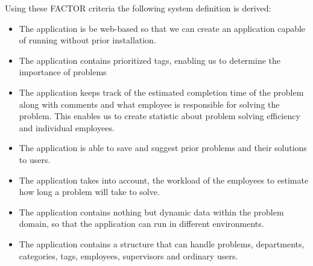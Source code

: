 Using these FACTOR criteria the following system definition is derived:
\begin{itemize}
\item The application is be web-based so that we can create an application capable of running without prior installation.
\item The application contains prioritized tags, enabling us to determine the importance of problems
\item The application keeps track of the estimated completion time of the problem along with comments and what employee is responsible for solving the problem. This enables us to create statistic about problem solving efficiency and individual employees.
\item The application is able to save and suggest prior problems and their solutions to users.
\item The application takes into account, the workload of the employees to estimate how long a problem will take to solve.
\item The application contains nothing but dynamic data within the problem domain, so that the application can run in different environments.
\item The application contains a structure that can handle problems, departments, categories, tags, employees, supervisors and ordinary users.
\end{itemize}


\begin{comment}
Using these FACTOR criteria, we arrive at the following system definition:
\begin{itemize}
\item The application is be web-based so that we can create an application capable of running without prior installation.
\item The application should contain prioritized tags, enabling us to determine the importance of problems
\item The application should keep track of the estimated completion time of the problem along with comments and what employee is responsible for the problem. This will enable us to create statistic about problem solving efficiency and individual employees.
\item The application should be able to save and suggest prior problems and their solutions to users.
\item The application should take into account, the workload of the employees to estimate how long a problem will take to solve.
\item The application should should contain nothing but dynamic data within the problem domain, so that the application can run in different environments.
\item The application should contain a structure that can handle problems, departments, categories, tags, employees, supervisors and ordinary users.
\end{itemize}
\end{comment}


